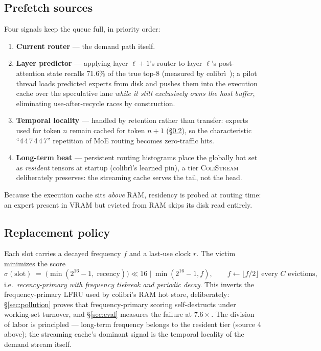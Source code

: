 \documentclass[11pt]{article}
\theoremstyle{definition}
\theoremstyle{remark}
\newcommand{\colistream}{\textsc{ColiStream}}
\begin{document}
\subsection{Prefetch sources}\label{sec:prefetch}
Four signals keep the queue full, in priority order:
\begin{enumerate}
\item \textbf{Current router} --- the demand path itself.
\item \textbf{Layer predictor} --- applying layer $\ell{+}1$'s router to
layer $\ell$'s post-attention state recalls 71.6\% of the true top-8
(measured by colibr\`i~\citep{colibri2026}); a pilot thread loads predicted
experts from disk and pushes them into the execution cache over the
speculative lane \emph{while it still exclusively owns the host buffer},
eliminating use-after-recycle races by construction.
\item \textbf{Temporal locality} --- handled by retention rather than
transfer: experts used for token $n$ remain cached for token $n{+}1$
(\S\ref{sec:policy}), so the characteristic ``4\,4\,7\,4\,4\,7'' repetition
of MoE routing becomes zero-traffic hits.
\item \textbf{Long-term heat} --- persistent routing histograms place the
globally hot set as \emph{resident} tensors at startup (colibr\`i's learned
pin), a tier \colistream{} deliberately preserves: the streaming cache
serves the tail, not the head.
\end{enumerate}
Because the execution cache sits \emph{above} RAM, residency is probed at
routing time: an expert present in VRAM but evicted from RAM skips its disk
read entirely.

\subsection{Replacement policy}\label{sec:policy}
Each slot carries a decayed frequency $f$ and a last-use clock $r$. The
victim minimizes the score
\begin{equation}
\sigma(\text{slot}) \;=\; \big(\min(2^{16}{-}1,\;\text{recency})\big)\!\ll\!16
\;\big|\;\min(2^{16}{-}1, f),
\qquad f \leftarrow \lfloor f/2 \rfloor \text{ every } C \text{ evictions},
\label{eq:score}
\end{equation}
i.e.\ \emph{recency-primary with frequency tiebreak and periodic decay}.
This inverts the frequency-primary LFRU used by colibr\`i's RAM hot store,
deliberately: \S\ref{sec:pollution} proves that frequency-primary scoring
self-destructs under working-set turnover, and \S\ref{sec:eval} measures the
failure at $7.6\times$. The division of labor is principled --- long-term
frequency belongs to the resident tier (source 4 above); the streaming
cache's dominant signal is the temporal locality of the demand stream itself.
\end{document}

